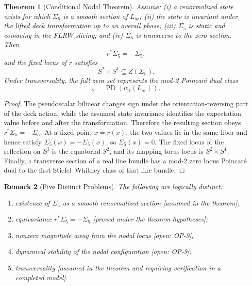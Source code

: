 \documentclass[11pt]{article}
\theoremstyle{canonmath}
\newtheorem{theorem}{Theorem}[section]
\newtheorem{remark}[theorem]{Remark}
\theoremstyle{canonpostulate}
\theoremstyle{canonclaim}
\providecommand{\Lor}{\mathcal L_{\mathrm{or}}}
\def\mathrm#1{#1}%
\def\mathcal#1{#1}%
\begin{document}
\begin{theorem}[Conditional Nodal Theorem] \label{thm:wall_zero}
Assume: (i) a renormalized state exists for which $\Sigma_5$ is a smooth section of $\Lor$; (ii) the state is invariant under the lifted deck transformation up to an overall phase; (iii) $\Sigma_5$ is static and comoving in the FLRW slicing; and (iv) $\Sigma_5$ is transverse to the zero section. Then
\begin{equation}
r^*\Sigma_5=-\Sigma_5,
\end{equation}
and the fixed locus of $r$ satisfies
\begin{equation}
S^2\times S^1\subseteq Z(\Sigma_5).
\end{equation}
Under transversality, the full zero set represents the mod-2 Poincar\'e dual class
\begin{equation}
[Z(\Sigma_5)]_2=\operatorname{PD}\!\left(w_1(\Lor)\right).
\end{equation}
\end{theorem}
\begin{proof}
The pseudoscalar bilinear changes sign under the orientation-reversing part of the deck action, while the assumed state invariance identifies the expectation value before and after the transformation. Therefore the resulting section obeys $r^*\Sigma_5=-\Sigma_5$. At a fixed point $x=r(x)$, the two values lie in the same fiber and hence satisfy $\Sigma_5(x)=-\Sigma_5(x)$, so $\Sigma_5(x)=0$. The fixed locus of the reflection on $S^3$ is the equatorial $S^2$, and its mapping-torus locus is $S^2\times S^1$. Finally, a transverse section of a real line bundle has a mod-2 zero locus Poincar\'e dual to the first Stiefel--Whitney class of that line bundle.
\end{proof}

\begin{remark}[Five Distinct Problems]
The following are logically distinct:
\begin{enumerate}
\item existence of $\Sigma_5$ as a smooth renormalized section [assumed in the theorem];
\item equivariance $r^*\Sigma_5=-\Sigma_5$ [proved under the theorem hypotheses];
\item nonzero magnitude away from the nodal locus [open: OP-9];
\item dynamical stability of the nodal configuration [open: OP-9];
\item transversality [assumed in the theorem and requiring verification in a completed model].
\end{enumerate}
\end{remark}
\end{document}
